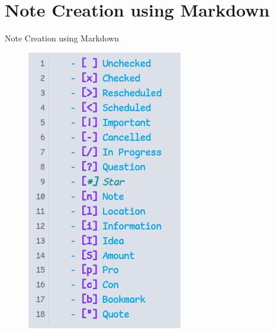 \documentclass[10pt, xcolor=dvipsnames]{beamer}
\begin{document}
	\section{Note Creation using Markdown}
	\begin{frame}{Note Creation using Markdown}
		\begin{figure}
			\centering
			\begin{minipage}{.32\textwidth}
				\centering
				\includegraphics[width=.95\linewidth]{../latex-image/markdown-code1}
			\end{minipage}%

\end{figure}
\end{frame}
\end{document}
